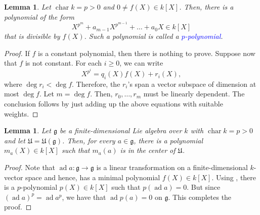 \documentclass[12pt]{article}
\theoremstyle{thmstyle}
\newtheorem{lemma}[theorem]{Lemma}
\theoremstyle{defstyle}
\newcommand{\chr}{\operatorname{char}}
\newcommand{\frakg}{\mathfrak{g}}
\newcommand{\frakU}{\mathfrak{U}}
\newcommand{\define}[1]{\textcolor{blue}{\textit{#1}}}
\renewcommand{\ge}{\geqslant}
\newcommand{\ad}{\operatorname{ad}}
\begin{document}
\begin{lemma}
    Let $\chr k = p > 0$ and $0\ne f(X)\in k[X]$. Then, there is a polynomial of the form 
    \begin{equation*}
        X^{p^{m}} + a_{m - 1} X^{p^{m - 1}} + \dots + a_0X\in k[X]
    \end{equation*}
    that is divisible by $f(X)$. Such a polynomial is called a \define{$p$-polynomial}.
\end{lemma}
\begin{proof}
    If $f$ is a constant polynomial, then there is nothing to prove. Suppose now that $f$ is not constant. For each $i\ge 0$, we can write 
    \begin{equation*}
        X^{p^i} = q_i(X)f(X) + r_i(X),
    \end{equation*}
    where $\deg r_i < \deg f$. Therefore, the $r_i$'s span a vector subspace of dimension at most $\deg f$. Let $m = \deg f$. Then, $r_0,\dots,r_m$ must be linearly dependent. The conclusion follows by just adding up the above equations with suitable weights.
\end{proof}

\begin{lemma}
    Let $\frakg$ be a finite-dimensional Lie algebra over $k$ with $\chr k = p > 0$ and let $\frakU = \frakU(\frakg)$. Then, for every $a\in\frakg$, there is a polynomial $m_a(X)\in k[X]$ such that $m_a(a)$ is in the center of $\frakU$.
\end{lemma}
\begin{proof}
    Note that $\ad a: \frakg\to\frakg$ is a linear transformation on a finite-dimensional $k$-vector space and hence, has a minimal polynomial $f(X)\in k[X]$. Using , there is a $p$-polynomial $p(X)\in k[X]$ such that $p(\ad a) = 0$. But since $(\ad a)^p = \ad a^p$, we have that $\ad p(a) = 0$ on $\frakg$. This completes the proof.
\end{proof}
\end{document}
